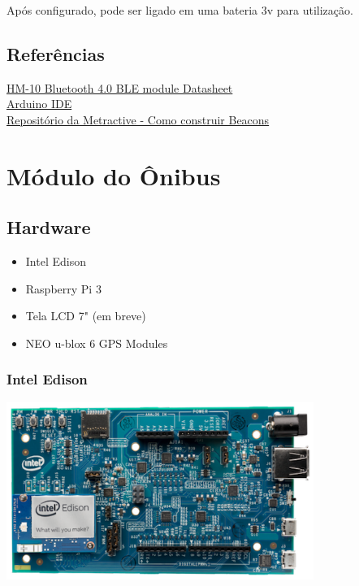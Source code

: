 \documentclass[a4paper, 12pt]{article}
\begin{document}
Após configurado, pode ser ligado em uma bateria 3v para utilização.

\subsection{Referências}

\href{ftp://imall.iteadstudio.com/Modules/IM130614001_Serial_Port_BLE_Module_Master_Slave_HM-10/DS_IM130614001_Serial_Port_BLE_Module_Master_Slave_HM-10.pdf}{HM-10 Bluetooth 4.0 BLE module Datasheet}
\\
\href{https://www.arduino.cc/en/main/software}{Arduino IDE}
\\
\href{https://github.com/metractive/beacon-study}{Repositório da Metractive - Como construir Beacons}

\section{Módulo do Ônibus}

\subsection{Hardware}

\begin{itemize}
\item Intel Edison
\item Raspberry Pi 3
\item Tela LCD 7" (em breve)
\item NEO u-blox 6 GPS Modules
\end{itemize}

\subsubsection{Intel Edison}

\includegraphics[width=10cm, center]{images/intel-edison-arduino-kit}
\end{document}
